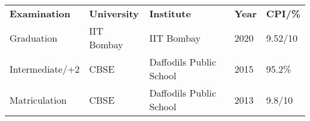 
\begin{tabular}{p{}p{}p{}p{}p{}}
    \textbf{Examination} & \textbf{University} & \textbf{Institute} & \textbf{Year} & \textbf{CPI/\%}  \\
     {Graduation} & {IIT Bombay} & {IIT Bombay} & {2020} & {9.52/10} \\ %
     {Intermediate/+2} & {CBSE} & {Daffodils Public School} & {2015} & {95.2\%} \\ 
     {Matriculation} & {CBSE} & {Daffodils Public School} & {2013} & {9.8/10} 
\end{tabular}